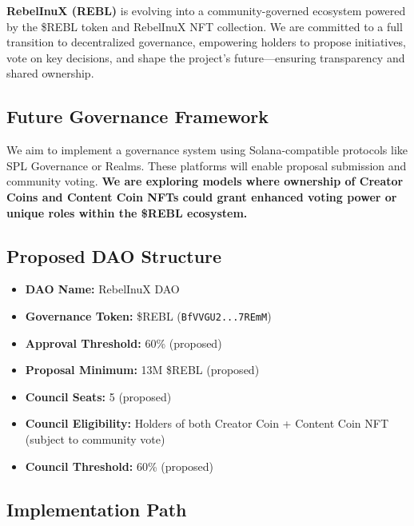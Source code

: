 \documentclass{article}
\begin{document}
\begin{tcolorbox}[colback=headerColor!10!white, colframe=headerColor, boxrule=2pt, width=\textwidth, arc=6mm]
\smallskip
\textbf{RebelInuX (REBL)} is evolving into a community-governed ecosystem powered by the \$REBL token and RebelInuX NFT collection. We are committed to a full transition to decentralized governance, empowering holders to propose initiatives, vote on key decisions, and shape the project's future—ensuring transparency and shared ownership.

\subsection[
  \texorpdfstring{\color{primaryColor}Future Governance Framework}{Future Governance Framework}
]{\color{primaryColor}Future Governance Framework}

We aim to implement a governance system using Solana-compatible protocols like SPL Governance or Realms. These platforms will enable proposal submission and community voting. \textbf{We are exploring models where ownership of Creator Coins and Content Coin NFTs could grant enhanced voting power or unique roles within the \$REBL ecosystem.}

\subsection[
  \texorpdfstring{\color{primaryColor}Proposed DAO Structure}{Proposed DAO Structure}
]{\color{primaryColor}Proposed DAO Structure}

\begin{itemize}
  \item \textbf{DAO Name:} RebelInuX DAO
  \item \textbf{Governance Token:} \$REBL (\texttt{BfVVGU2...7REmM})
  \item \textbf{Approval Threshold:} 60\% (proposed)
  \item \textbf{Proposal Minimum:} 13M \$REBL (proposed)
  \item \textbf{Council Seats:} 5 (proposed)
  \item \textbf{Council Eligibility:} Holders of both Creator Coin + Content Coin NFT (subject to community vote)
  \item \textbf{Council Threshold:} 60\% (proposed)
\end{itemize}

\subsection[
  \texorpdfstring{\color{primaryColor}Implementation Path}{Implementation Path}
]{\color{primaryColor}Implementation Path}


\end{tcolorbox}
\end{document}
